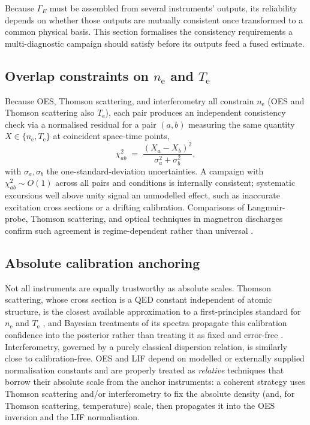 Because $\Gamma_{E}$ must be assembled from several instruments' outputs, its reliability depends on whether those outputs are mutually consistent once transformed to a common physical basis. This section formalises the consistency requirements a multi-diagnostic campaign should satisfy before its outputs feed a fused estimate.

\subsection{Overlap constraints on $n_{\mathrm{e}}$ and $T_{\mathrm{e}}$}

Because OES, Thomson scattering, and interferometry all constrain $n_{\mathrm{e}}$ (OES and Thomson scattering also $T_{\mathrm{e}}$), each pair produces an independent consistency check via a normalised residual for a pair $(a, b)$ measuring the same quantity $X \in \{n_{\mathrm{e}}, T_{\mathrm{e}}\}$ at coincident space-time points,
\begin{equation}
\chi_{ab}^{2} \;=\; \frac{\left(X_{a} - X_{b}\right)^{2}}{\sigma_{a}^{2} + \sigma_{b}^{2}},
\label{eq:chi2_pairwise}
\end{equation}
with $\sigma_{a}, \sigma_{b}$ the one-standard-deviation uncertainties. A campaign with $\chi_{ab}^{2} \sim O(1)$ across all pairs and conditions is internally consistent; systematic excursions well above unity signal an unmodelled effect, such as inaccurate excitation cross sections or a drifting calibration. Comparisons of Langmuir-probe, Thomson scattering, and optical techniques in magnetron discharges confirm such agreement is regime-dependent rather than universal \cite{ref0355}.

\subsection{Absolute calibration anchoring}

Not all instruments are equally trustworthy as absolute scales. Thomson scattering, whose cross section is a QED constant independent of atomic structure, is the closest available approximation to a first-principles standard for $n_{\mathrm{e}}$ and $T_{\mathrm{e}}$ \cite{ref0384}, and Bayesian treatments of its spectra propagate this calibration confidence into the posterior rather than treating it as fixed and error-free \cite{ref0684}. Interferometry, governed by a purely classical dispersion relation, is similarly close to calibration-free. OES and LIF depend on modelled or externally supplied normalisation constants and are properly treated as \emph{relative} techniques that borrow their absolute scale from the anchor instruments: a coherent strategy uses Thomson scattering and/or interferometry to fix the absolute density (and, for Thomson scattering, temperature) scale, then propagates it into the OES inversion and the LIF normalisation.

